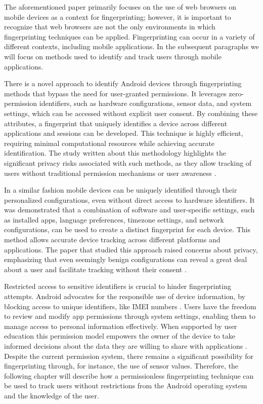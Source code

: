 \documentclass[11pt,
  oneside,openany,    %
]{scrreprt}
\begin{document}
The aforementioned paper primarily focuses on the use of web browsers on mobile devices as a context for fingerprinting; however, it is important to recognize that web browsers are not the only environments in which fingerprinting techniques can be applied.
Fingerprinting can occur in a variety of different contexts, including mobile applications.
In the subsequent paragraphs we will focus on methods used to identify and track users through mobile applications.

There is a novel approach to identify Android devices through fingerprinting methods that bypass the need for user-granted permissions.
It leverages zero-permission identifiers, such as hardware configurations, sensor data, and system settings, which can be accessed without explicit user consent.
By combining these attributes, a fingerprint that uniquely identifies a device across different applications and sessions can be developed.
This technique is highly efficient, requiring minimal computational resources while achieving accurate identification.
The study written about this methodology highlights the significant privacy risks associated with such methods, as they allow tracking of users without traditional permission mechanisms or user awareness \cite{DBLP:journals/access/WuWWLY16}.

In a similar fashion mobile devices can be uniquely identified through their personalized configurations, even without direct access to hardware identifiers.
It was demonstrated that a combination of software and user-specific settings, such as installed apps, language preferences, timezone settings, and network configurations, can be used to create a distinct fingerprint for each device.
This method allows accurate device tracking across different platforms and applications.
The paper that studied this approach raised concerns about privacy, emphasizing that even seemingly benign configurations can reveal a great deal about a user and facilitate tracking without their consent \cite{DBLP:journals/popets/KurtzGBRF16}.

Restricted access to sensitive identifiers is crucial to hinder fingerprinting attempts. 
Android advocates for the responsible use of device information, by blocking access to unique identifiers, like IMEI numbers \cite{android_privacy_10, DBLP:conf/ndss/MengZXZZBLTD23}.
Users have the freedom to review and modify app permissions through system settings, enabling them to manage access to personal information effectively. 
When supported by user education this permission model empowers the owner of the device to take informed decisions about the data they are willing to share with applications \cite{DBLP:conf/icta/NegashS15}.
Despite the current permission system, there remains a significant possibility for fingerprinting through, for instance, the use of sensor values.
Therefore, the following chapter will describe how a permissionless fingerprinting technique can be used to track users without restrictions from the Android operating system and the knowledge of the user.
\end{document}
